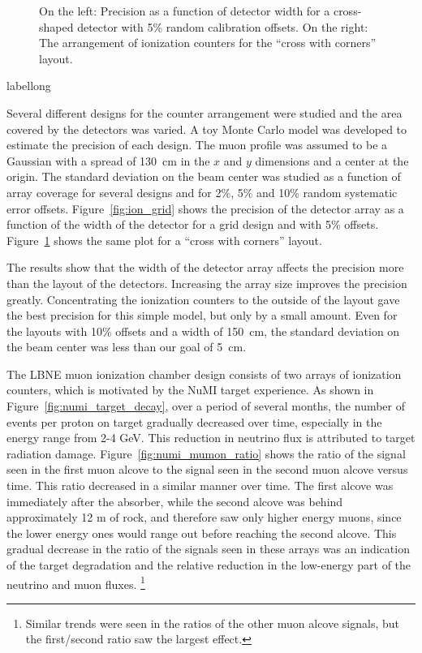 \begin{figure}[htb]
\centering
\caption[Ion chamber performance for cross-with-corners layout]
{On the left: Precision as a function of detector width for a cross-shaped detector 
with 5\% random calibration offsets. On the right: The 
arrangement of ionization counters for the ``cross with corners'' layout.}
\label{fig:cross_grid}
\end{figure}
\begin{cdrfigure}[short]{label}{long}
\end{cdrfigure}

Several different designs for the counter arrangement were studied and the
area covered by the detectors was varied. A toy Monte Carlo model was
developed to estimate the precision of each design. The muon profile
was assumed to be a Gaussian with a spread of 130~cm in the $x$ and $y$
dimensions and a center at the origin. 
The standard deviation on the beam center was studied as a
function of array coverage for several designs and for 2\%, 5\% and
10\% random systematic error offsets. Figure~\ref{fig:ion_grid} shows the
precision of the detector array as a function of the width of the
detector for a grid design and with 5\%
offsets. Figure~\ref{fig:cross_grid} shows the same plot for a
``cross with corners'' layout.



The results show that the width of the detector array affects the
precision more than the layout of the detectors. Increasing the array
size improves the precision greatly. Concentrating the ionization
counters to the outside of the layout gave the best precision for this
simple model, but only by a small amount. Even for the layouts with
10\% offsets and a width of 150~cm, the standard deviation on the beam
center was less than our goal of 5~cm.

The LBNE muon ionization chamber design consists of two arrays of 
ionization counters, which is motivated by the NuMI target experience.  As shown in Figure~\ref{fig:numi_target_decay}, over a period of several months, the number of events per proton on target gradually decreased over time, especially in the energy range from 2-4 GeV.  
This reduction in neutrino flux is attributed to 
target radiation damage.  Figure~\ref{fig:numi_mumon_ratio} shows the ratio of the signal seen  in the first muon alcove to the signal seen in the second muon alcove versus time.  This ratio decreased in a similar manner over time.  
The first alcove was immediately after the absorber, while the second alcove was behind approximately 12 m of rock, and therefore saw only higher energy muons, since the lower energy ones would range out before reaching the second alcove.  
This gradual decrease in the ratio of the signals seen in these arrays was an indication of the target degradation and the relative reduction in the 
low-energy part of the neutrino and muon fluxes.  \footnote{Similar trends were seen in the ratios of the other muon alcove signals, but the first/second ratio saw the largest effect.}

